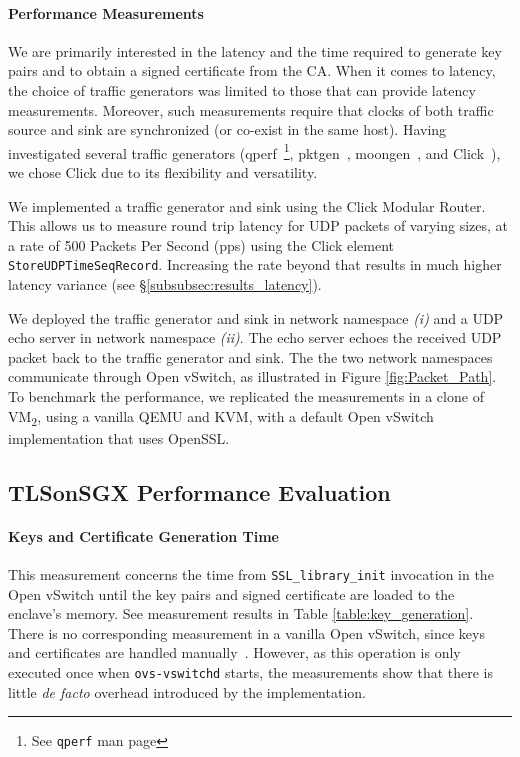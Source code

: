 {\paragraph{Performance Measurements}
\label{sec:performance_management}
We are primarily interested in the latency and the time required to generate key pairs and to obtain a signed certificate from the CA. 
When it comes to latency, the choice of traffic generators was limited to those that can provide latency measurements.
Moreover, such measurements require that clocks of both traffic source and sink are synchronized (or co-exist in the same host).
Having investigated several traffic generators (qperf~\footnote{See \texttt{qperf} man page}, pktgen~\cite{olsson:2005}, moongen~\cite{emmerich:2015}, and Click~\cite{morris:2000}), we chose Click due to its flexibility and versatility.

We implemented a traffic generator and sink using the Click Modular Router.
This allows us to measure round trip latency for UDP packets of varying sizes, at a rate of 500 Packets Per Second (pps) using the Click element \newline \texttt{StoreUDPTimeSeqRecord}.
Increasing the rate beyond that results in much higher latency variance (see \S\ref{subsubsec:results_latency}).

We deployed the traffic generator and sink in network namespace \textit{(i)} and a UDP echo server in network namespace \textit{(ii)}. 
The echo server echoes the received UDP packet back to the traffic generator and sink. 
The the two network namespaces communicate through Open vSwitch, as illustrated in Figure \ref{fig:Packet_Path}.
To benchmark the performance, we replicated the measurements in a clone of VM\textsubscript{2}, using a vanilla QEMU and 
KVM, with a default Open vSwitch implementation that uses OpenSSL.


\subsection{TLSonSGX Performance Evaluation}
\paragraph{Keys and Certificate Generation Time}
\label{section:keys_time}
This measurement concerns the time from \texttt{SSL\_library\_init} invocation in the Open vSwitch until the key pairs and signed certificate are loaded to the enclave's memory.
See measurement results in Table \ref{table:key_generation}.
There is no corresponding measurement in a vanilla Open vSwitch, since keys and certificates are handled manually~\cite{ovs_ssl}. 
However, as this operation is only executed once when \texttt{ovs-vswitchd} starts, the measurements show that there is little \textit{de facto} overhead introduced by the implementation. 

}
